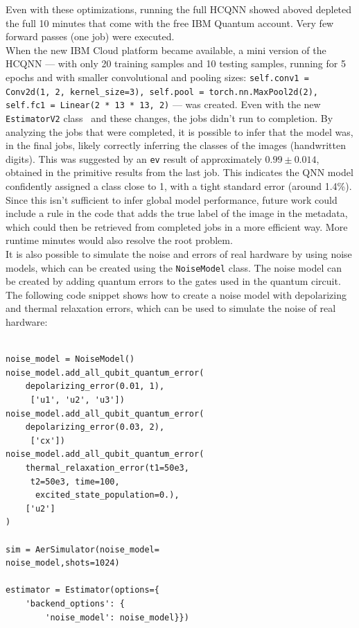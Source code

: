 \documentclass[conference]{IEEEtran}
\begin{document}
\noindent
Even with these optimizations, running the full HCQNN showed aboved depleted the full 10 minutes that come with the free IBM Quantum account. 
Very few forward passes (one job) were executed.\\


\noindent
When the new IBM Cloud platform became available, a mini version of the HCQNN — with only 20 training samples and 10 testing samples, running for 5 epochs and with smaller convolutional and pooling sizes: \texttt{self.conv1 = Conv2d(1, 2, kernel\_size=3), self.pool = torch.nn.MaxPool2d(2), self.fc1 = Linear(2 * 13 * 13, 2)} — was created. Even with the new \texttt{EstimatorV2} class~\cite{qiskit_estimator_v2} and these changes, the jobs didn't run to completion. By analyzing the jobs that were completed, it is possible to infer that the model was, in the final jobs, likely correctly inferring the classes of the images (handwritten digits). This was suggested by an \texttt{ev} result of approximately $0.99 \pm 0.014$, obtained in the primitive results from the last job. This indicates the QNN model confidently assigned a class close to 1, with a tight standard error (around 1.4\%). Since this isn't sufficient to infer global model performance, future work could include a rule in the code that adds the true label of the image in the metadata, which could then be retrieved from completed jobs in a more efficient way. More runtime minutes would also resolve the root problem.\\


\noindent
It is also possible to simulate the noise and errors of real hardware by using noise models, which can be created using the \texttt{NoiseModel} \cite{qiskit_noise_models} class.
The noise model can be created by adding quantum errors to the gates used in the quantum circuit. The following code snippet shows how to create a noise model with depolarizing and thermal relaxation errors, which can be used to simulate the noise of real hardware:

{\small
\begin{verbatim}

noise_model = NoiseModel()
noise_model.add_all_qubit_quantum_error(
    depolarizing_error(0.01, 1),
     ['u1', 'u2', 'u3'])
noise_model.add_all_qubit_quantum_error(
    depolarizing_error(0.03, 2),
     ['cx'])
noise_model.add_all_qubit_quantum_error(
    thermal_relaxation_error(t1=50e3,
     t2=50e3, time=100,
      excited_state_population=0.),
    ['u2']
)

sim = AerSimulator(noise_model=
noise_model,shots=1024)

estimator = Estimator(options={
    'backend_options': {
        'noise_model': noise_model}})

\end{verbatim}}
\end{document}

